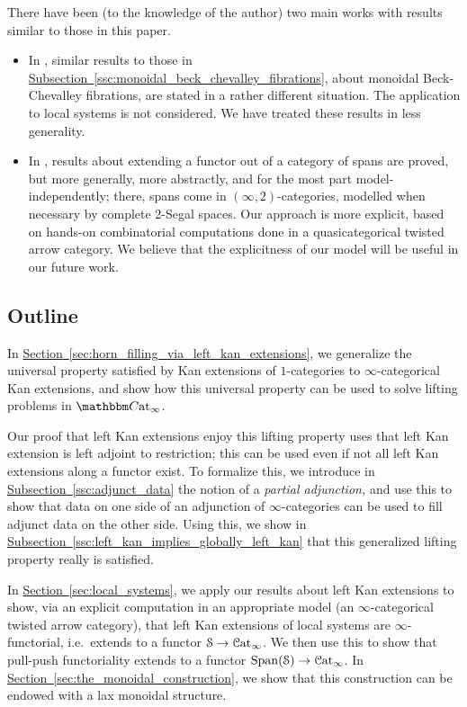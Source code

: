 \documentclass[main.tex]{subfiles}
\begin{document}
There have been (to the knowledge of the author) two main works with results similar to those in this paper.
\begin{itemize}
  \item In \cite{spectralmackeyfunctors2}, similar results to those in \hyperref[ssc:monoidal_beck_chevalley_fibrations]{Subsection~\ref*{ssc:monoidal_beck_chevalley_fibrations}}, about monoidal Beck-Chevalley fibrations, are stated in a rather different situation. The application to local systems is not considered. We have treated these results in less generality.

  \item In \cite{gaitsgory2019study}, results about extending a functor out of a category of spans are proved, but more generally, more abstractly, and for the most part model-independently; there, spans come in $(\infty, 2)$-categories, modelled when necessary by complete 2-Segal spaces. Our approach is more explicit, based on hands-on combinatorial computations done in a quasicategorical twisted arrow category. We believe that the explicitness of our model will be useful in our future work.
\end{itemize}

\subsection{Outline}
\label{ssc:outline}

In \hyperref[sec:horn_filling_via_left_kan_extensions]{Section~\ref*{sec:horn_filling_via_left_kan_extensions}}, we generalize the universal property satisfied by Kan extensions of $1$-categories to $\infty$-categorical Kan extensions, and show how this universal property can be used to solve lifting problems in $\ICCat$.

Our proof that left Kan extensions enjoy this lifting property uses that left Kan extension is left adjoint to restriction; this can be used even if not all left Kan extensions along a functor exist. To formalize this, we introduce in \hyperref[ssc:adjunct_data]{Subsection~\ref*{ssc:adjunct_data}} the notion of a \emph{partial adjunction,} and use this to show that data on one side of an adjunction of $\infty$-categories can be used to fill adjunct data on the other side. Using this, we show in \hyperref[ssc:left_kan_implies_globally_left_kan]{Subsection~\ref*{ssc:left_kan_implies_globally_left_kan}} that this generalized lifting property really is satisfied.

In \hyperref[sec:local_systems]{Section~\ref*{sec:local_systems}}, we apply our results about left Kan extensions to show, via an explicit computation in an appropriate model (an $\infty$-categorical twisted arrow category), that left Kan extensions of local systems are $\infty$-functorial, i.e.\ extends to a functor $\mathcal{S} \to \mathcal{C}\mathrm{at}_{\infty}$. We then use this to show that pull-push functoriality extends to a functor $\mathrm{Span}(\mathcal{S}) \to \mathcal{C}\mathrm{at}_{\infty}$. In \hyperref[sec:the_monoidal_construction]{Section~\ref*{sec:the_monoidal_construction}}, we show that this construction can be endowed with a lax monoidal structure.
\end{document}

